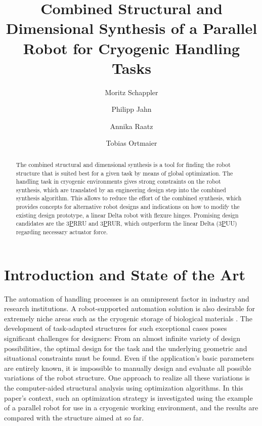 \documentclass{svproc}
\begin{document}
\mainmatter              %
%
\title{Combined Structural and Dimensional Synthesis of a Parallel Robot for Cryogenic Handling Tasks}
%
\author{Moritz Schappler \and Philipp Jahn \and Annika Raatz \and Tobias Ortmaier}
%

\maketitle              %

\begin{abstract}
The combined structural and dimensional synthesis is a tool for finding the robot structure that is suited best for a given task by means of global optimization.
The handling task in cryogenic environments gives strong constraints on the robot synthesis, which are translated by an engineering design step into the combined synthesis algorithm.
This allows to reduce the effort of the combined synthesis, which provides concepts for alternative robot designs and indications on how to modify the existing design prototype, a linear Delta robot with flexure hinges. Promising design candidates are the 3\underline{P}RRU and 3\underline{P}RUR, which outperform the linear Delta (3\underline{P}UU) regarding necessary actuator force.
\end{abstract}
%
\section{Introduction and State of the Art}
%

The automation of handling processes is an omnipresent factor in industry and research institutions. 
A robot-supported automation solution is also desirable for extremely niche areas such as the cryogenic storage of biological materials \cite{BorchertLoeBruCar2013}.
The development of task-adapted structures for such exceptional cases poses significant challenges for designers: From an almost infinite variety of design possibilities, the optimal design for the task and the underlying geometric and situational constraints must be found. 
Even if the application's basic parameters are entirely known, it is impossible to manually design and evaluate all possible variations of the robot structure.
One approach to realize all these variations is the computer-aided structural analysis using optimization algorithms. 
In this paper's context, such an optimization strategy is investigated using the example of a parallel robot for use in a cryogenic working environment, and the results are compared with the structure aimed at so far.
\end{document}
